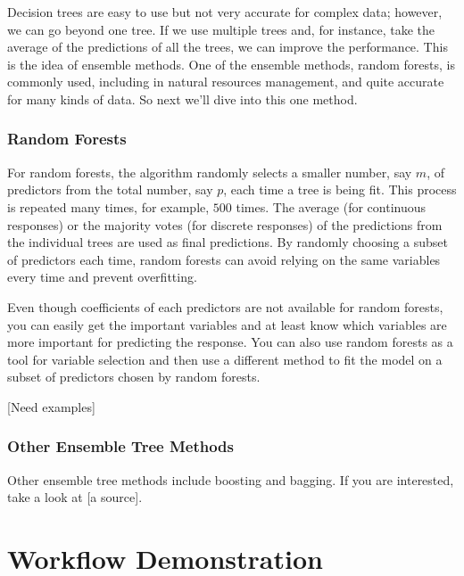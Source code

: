 \documentclass[
]{book}
\begin{document}
Decision trees are easy to use but not very accurate for complex data; however, we can go beyond one tree. If we use multiple trees and, for instance, take the average of the predictions of all the trees, we can improve the performance. This is the idea of ensemble methods. One of the ensemble methods, random forests, is commonly used, including in natural resources management, and quite accurate for many kinds of data. So next we'll dive into this one method.

\hypertarget{random-forests}{%
\subsection{Random Forests}\label{random-forests}}

For random forests, the algorithm randomly selects a smaller number, say \(m\), of predictors from the total number, say \(p\), each time a tree is being fit. This process is repeated many times, for example, \(500\) times. The average (for continuous responses) or the majority votes (for discrete responses) of the predictions from the individual trees are used as final predictions. By randomly choosing a subset of predictors each time, random forests can avoid relying on the same variables every time and prevent overfitting.

Even though coefficients of each predictors are not available for random forests, you can easily get the important variables and at least know which variables are more important for predicting the response. You can also use random forests as a tool for variable selection and then use a different method to fit the model on a subset of predictors chosen by random forests.

{[}Need examples{]}

\hypertarget{other-ensemble-tree-methods}{%
\subsection{Other Ensemble Tree Methods}\label{other-ensemble-tree-methods}}

Other ensemble tree methods include boosting and bagging. If you are interested, take a look at {[}a source{]}.

\hypertarget{workflow-demonstration}{%
\chapter{Workflow Demonstration}\label{workflow-demonstration}}
\end{document}
